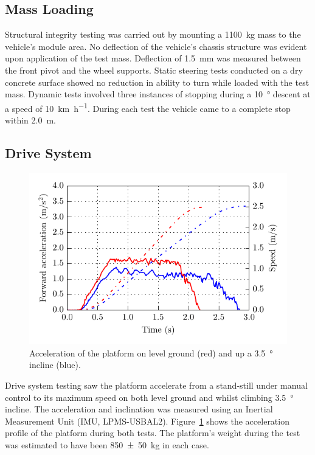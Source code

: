\documentclass[preprint,authoryear,12pt]{elsarticle}
\begin{document}
  \subsection{Mass Loading}
    Structural integrity testing was carried out by mounting a \SI{1100}{\kilo\gram} mass to the vehicle's module area.
    No deflection of the vehicle's chassis structure was evident upon application of the test mass.
    Deflection of \SI{1.5}{\milli\meter} was measured between the front pivot and the wheel supports.
    Static steering tests conducted on a dry concrete surface showed no reduction in ability to turn while loaded with the test mass.
    Dynamic tests involved three instances of stopping during a \SI{10}{\degree} descent at a speed of \SI{10}{\kilo\meter\per\hour}.
    During each test the vehicle came to a complete stop within \SI{2.0}{\meter}.

  \subsection{Drive System}

    \begin{figure}[htb]
        \centering
        \includegraphics{images/graph_acceleration.pdf}
        \caption{
            Acceleration of the platform on level ground (red) and up a \SI{3.5}{\degree} incline (blue).
        }
        \label{fig:acceleration}
    \end{figure}

    Drive system testing saw the platform accelerate from a stand-still under manual control to its maximum speed on both level ground and whilst climbing \SI{3.5}{\degree} incline.
    The acceleration and inclination was measured using an Inertial Measurement Unit (IMU, LPMS-USBAL2).
    Figure~\ref{fig:acceleration} shows the acceleration profile of the platform during both tests.
    The platform's weight during the test was estimated to have been \SI[separate-uncertainty=true]{850(50)}{\kilo\gram} in each case.
\end{document}
